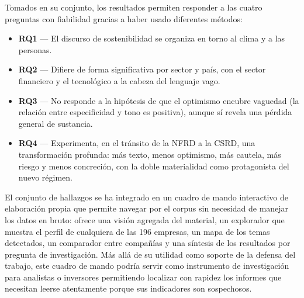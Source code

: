 Tomados en su conjunto, los resultados permiten responder a las cuatro preguntas con fiabilidad gracias a haber usado diferentes métodos:

\begin{itemize}
    \item \textbf{RQ1} — El discurso de sostenibilidad se organiza en torno al clima y a las personas.
    \item \textbf{RQ2} — Difiere de forma significativa por sector y país, con el sector financiero y el tecnológico a la cabeza del lenguaje vago.
    \item \textbf{RQ3} — No responde a la hipótesis de que el optimismo encubre vaguedad (la relación entre especificidad y tono es positiva), aunque sí revela una pérdida general de sustancia.
    \item \textbf{RQ4} — Experimenta, en el tránsito de la NFRD a la CSRD, una transformación profunda: más texto, menos optimismo, más cautela, más riesgo y menos concreción, con la doble materialidad como protagonista del nuevo régimen.
\end{itemize}

El conjunto de hallazgos se ha integrado en un cuadro de mando
interactivo de elaboración propia que permite navegar por el corpus sin necesidad de manejar los
datos en bruto: ofrece una visión agregada del material, un explorador que muestra el perfil de
cualquiera de las 196 empresas, un mapa de los temas detectados, un comparador entre compañías y
una síntesis de los resultados por pregunta de investigación. Más allá de su utilidad como
soporte de la defensa del trabajo, este cuadro de mando podría servir como instrumento de investigación para analistas o inversores 
permitiendo localizar con rapidez los informes que necesitan leerse atentamente porque sus indicadores son sospechosos.
